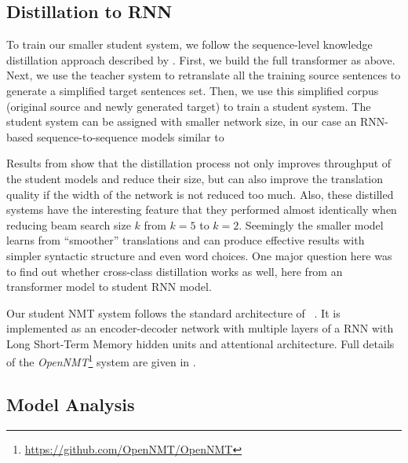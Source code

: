 \documentclass[11pt,a4paper]{article}
\begin{document}
\subsection{Distillation to RNN}
\label{distill}

To train our smaller student system, we follow the sequence-level
knowledge distillation approach described by
. First, we build the full transformer as
above. Next, we use the teacher system to retranslate all the training
source sentences to generate a simplified target sentences set.  Then,
we use this simplified corpus (original source and newly generated
target) to train a student system.  The student system can be assigned
with smaller network size, in our case an RNN-based
sequence-to-sequence models similar to 

Results from  show that the
distillation process not only improves throughput of the student
models and reduce their size, but can also improve the translation
quality if the width of the network is not reduced too much. Also,
these distilled systems have the interesting feature that they
performed almost identically when reducing beam search size $k$ from
$k=5$ to $k=2$. Seemingly the smaller model learns from ``smoother''
translations and can produce effective results with simpler syntactic
structure and even word choices. One major question here was to find
out whether cross-class distillation works as well, here from an
transformer model to student RNN model.

Our student NMT system follows the standard architecture of
~. It is implemented as an
encoder-decoder network with multiple layers of a RNN with Long
Short-Term Memory hidden \cite{Hochreiter:1997:LSM:1246443.1246450} units and attentional architecture. Full
details of the
\textit{OpenNMT}\footnote{\url{https://github.com/OpenNMT/OpenNMT}}
system are given in .


\subsection{Model Analysis}
\label{seq2seq}
\end{document}
